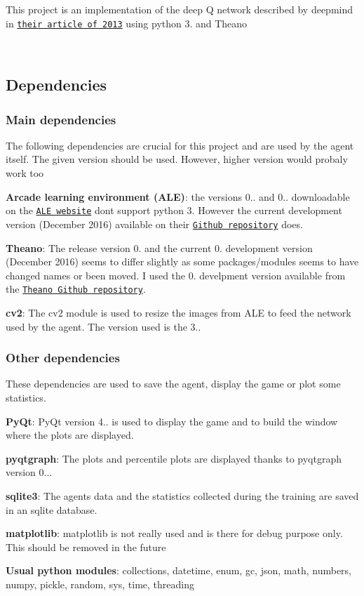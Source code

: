 This project is an implementation of the deep Q network described by deepmind in \href{https://arxiv.org/abs/1312.5602}{\tt their article of 2013} using python 3. and Theano

~ \subsection*{Dependencies}

\subsubsection*{Main dependencies}

The following dependencies are crucial for this project and are used by the agent itself. The given version should be used. However, higher version would probaly work too
\begin{DoxyItemize}
\item {\bfseries Arcade learning environment (A\+LE)}\+: the versions 0.. and 0.. downloadable on the \href{http://www.arcadelearningenvironment.org/downloads/}{\tt A\+LE website} don\textquotesingle{}t support python 3. However the current development version (December 2016) available on their \href{https://github.com/mgbellemare/Arcade-Learning-Environment}{\tt Github repository} does.
\item {\bfseries Theano}\+: The release version 0. and the current 0. development version (December 2016) seems to differ slightly as some packages/modules seems to have changed names or been moved. I used the 0. develpment version available from the \href{https://github.com/Theano/Theano}{\tt Theano Github repository}.
\item {\bfseries cv2}\+: The cv2 module is used to resize the images from A\+LE to feed the network used by the agent. The version used is the 3..
\end{DoxyItemize}

\subsubsection*{Other dependencies}

These dependencies are used to save the agent, display the game or plot some statistics.
\begin{DoxyItemize}
\item {\bfseries Py\+Qt}\+: Py\+Qt version 4.. is used to display the game and to build the window where the plots are displayed.
\item {\bfseries pyqtgraph}\+: The plots and percentile plots are displayed thanks to pyqtgraph version 0...
\item {\bfseries sqlite3}\+: The agent\textquotesingle{}s data and the statistics collected during the training are saved in an sqlite database.
\item {\bfseries matplotlib}\+: matplotlib is not really used and is there for debug purpose only. This should be removed in the future
\item {\bfseries Usual python modules}\+: collections, datetime, enum, gc, json, math, numbers, numpy, pickle, random, sys, time, threading
\end{DoxyItemize}

